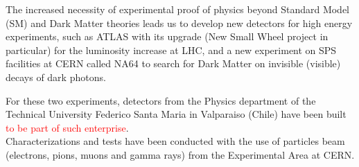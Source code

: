 	The increased necessity of experimental proof of physics beyond Standard Model (SM) and Dark Matter theories leads us
	to develop new detectors for high energy experiments, such as ATLAS with its upgrade (New Small Wheel project in
	particular) for the luminosity increase at LHC, and a new experiment on SPS facilities at CERN called NA64 to search
	for Dark Matter on invisible (visible) decays of dark photons.\par
		For these two experiments, detectors from the Physics department of the Technical University Federico Santa Maria
in Valparaiso (Chile)	have been built \textcolor{red}{to be part of such enterprise}.\\
	Characterizations and tests have been conducted with the use of particles beam (electrons, pions, muons and gamma rays) from the Experimental Area at CERN.\par

